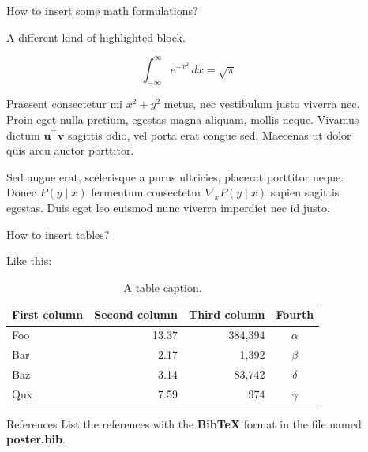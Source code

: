 \documentclass[final]{beamer}
\newlength{\sepwidth}
\newlength{\colwidth}
\newcommand{\separatorcolumn}{\begin{column}{\sepwidth}\end{column}}
\begin{document}
\begin{frame}[t]
\begin{columns}[t]
\separatorcolumn

\begin{column}{\colwidth}

  \begin{exampleblock}{How to insert some math formulations?}

    A different kind of highlighted block.

    $$
    \int_{-\infty}^{\infty} e^{-x^2}\,dx = \sqrt{\pi}
    $$


    Praesent consectetur mi $x^2 + y^2$ metus, nec vestibulum justo viverra
    nec. Proin eget nulla pretium, egestas magna aliquam, mollis neque. Vivamus
    dictum $\mathbf{u}^\intercal\mathbf{v}$ sagittis odio, vel porta erat
    congue sed. Maecenas ut dolor quis arcu auctor porttitor.


    Sed augue erat, scelerisque a purus ultricies, placerat porttitor neque.
    Donec $P(y \mid x)$ fermentum consectetur $\nabla_x P(y \mid x)$ sapien
    sagittis egestas. Duis eget leo euismod nunc viverra imperdiet nec id
    justo.

  \end{exampleblock}

  \begin{block}{How to insert tables?}

    Like this:

    \begin{table}
      \centering
      \begin{tabular}{l r r c}
        \toprule
        \textbf{First column} & \textbf{Second column} & \textbf{Third column} & \textbf{Fourth} \\
        \midrule
        Foo & 13.37 & 384,394 & $\alpha$ \\
        Bar & 2.17 & 1,392 & $\beta$ \\
        Baz & 3.14 & 83,742 & $\delta$ \\
        Qux & 7.59 & 974 & $\gamma$ \\
        \bottomrule
      \end{tabular}
      \caption{A table caption.}
    \end{table}



  \end{block}

  \begin{block}{References}
List the references with the \textbf{BibTeX} format in the file named \textbf{poster.bib}.
    \nocite{*}
    \footnotesize{}

  \end{block}

\end{column}

\separatorcolumn
\end{columns}
\end{frame}
\end{document}

